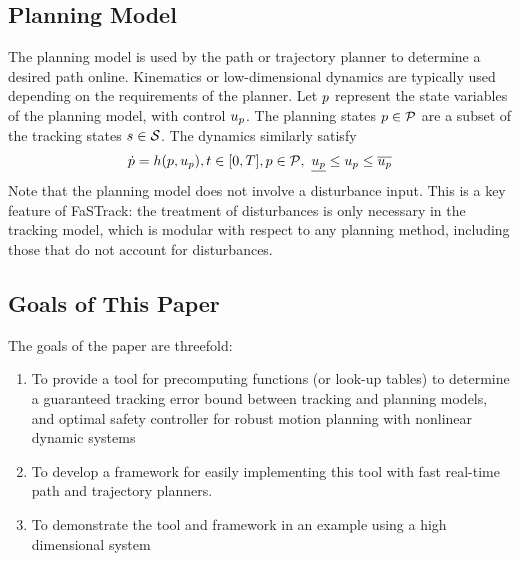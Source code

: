 \subsection{Planning Model}
The planning model is used by the path or trajectory planner to determine a desired path online. Kinematics or low-dimensional dynamics are typically used depending on the requirements of the planner. Let $p$ represent the state variables of the planning model, with control $u_p$. The planning states $p \in \mathcal{P}$ are a subset of the tracking states $s \in \mathcal{S}$. The dynamics similarly satisfy 
\begin{equation}
\begin{aligned}
\label{eq:pdyn}
\dot{p} = h(p, u_p), t \in [0, T], p \in \mathcal{P}, \ \underline{u_p} \leq u_p \leq \overline{u_p}
\end{aligned}
\end{equation}
Note that the planning model does not involve a disturbance input. This is a key feature of FaSTrack: the treatment of disturbances is only necessary in the tracking model, which is modular with respect to any planning method, including those that do not account for disturbances.

\subsection{Goals of This Paper}
The goals of the paper are threefold:
\begin{enumerate}
	\item To provide a tool for precomputing functions (or look-up tables) to determine a guaranteed tracking error bound between tracking and planning models, and optimal safety controller for robust motion planning with nonlinear dynamic systems
	\item To develop a framework for easily implementing this tool with fast real-time path and trajectory planners.
	\item To demonstrate the tool and framework in an example using a high dimensional system
\end{enumerate}

